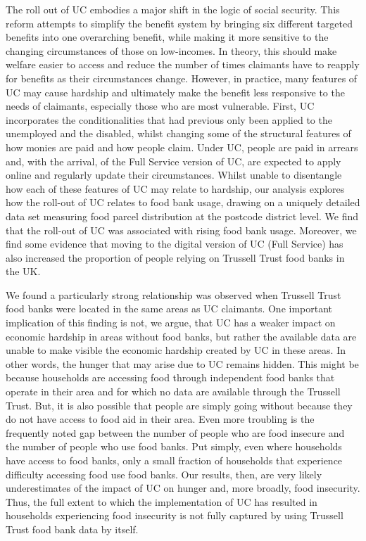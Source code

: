 \documentclass[12pt,article,oneside]{memoir}
\begin{document}
The roll out of UC embodies a major shift in the logic of social security. This reform attempts to simplify the benefit system by bringing six different targeted benefits into one overarching benefit, while making it more sensitive to the changing circumstances of those on low-incomes. In theory, this should make welfare easier to access and reduce the number of times claimants have to reapply for benefits as their circumstances change. However, in practice, many features of UC may cause hardship and ultimately make the benefit less responsive to the needs of claimants, especially those who are most vulnerable. First, UC incorporates the conditionalities that had previous only been applied to the unemployed and the disabled, whilst changing some of the structural features of how monies are paid and how people claim. Under UC, people are paid in arrears and, with the arrival, of the Full Service version of UC, are expected to apply online and regularly update their circumstances. Whilst unable to disentangle how each of these features of UC may relate to hardship, our analysis explores how the roll-out of UC relates to food bank usage, drawing on a uniquely detailed data set measuring food parcel distribution at the postcode district level. We find that the roll-out of UC was associated with rising food bank usage. Moreover, we find some evidence that moving to the digital version of UC (Full Service) has also increased the proportion of people relying on Trussell Trust food banks in the UK. 

We found a particularly strong relationship was observed when Trussell Trust food banks were located in the same areas as UC claimants. One important implication of this finding is not, we argue, that UC has a weaker impact on economic hardship in areas without food banks, but rather the available data are unable to make visible the economic hardship created by UC in these areas. In other words, the hunger that may arise due to UC remains hidden. This might be because households are accessing food through independent food banks that operate in their area and for which no data are available through the Trussell Trust. But, it is also possible that people are simply going without because they do not have access to food aid in their area. Even more troubling is the frequently noted gap between the number of people who are food insecure and the number of people who use food banks. Put simply, even where households have access to food banks, only a small fraction of households that experience difficulty accessing food use food banks. Our results, then, are very likely underestimates of the impact of UC on hunger and, more broadly, food insecurity. Thus, the full extent to which the implementation of UC has resulted in households experiencing food insecurity is not fully captured by using Trussell Trust food bank data by itself. 
\end{document}
